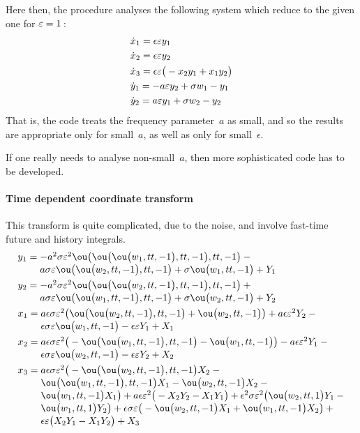 Here then, the procedure analyses the following system which reduce to the given one for \(\varepsilon=1\)\,:
\begin{align*}&
\dot x_{1}=\epsilon  \varepsilon y_{1}
\\&
\dot x_{2}=\epsilon  \varepsilon y_{2}
\\&
\dot x_{3}=\epsilon  \varepsilon \big(-x_{2} y_{1}+x_{1} y_{2}\big)
\\&
\dot y_{1}=-a \varepsilon y_{2}+\sigma  w_{1}-y_{1}
\\&
\dot y_{2}=a \varepsilon y_{1}+\sigma  w_{2}-y_{2}
\end{align*}
That is, the code treats the frequency parameter~\(a\) as small, and so the results are appropriate only for small~\(a\), as well as only for small~\(\epsilon\).

If one really needs to analyse non-small~\(a\), then more sophisticated code has to be developed.



\paragraph{Time dependent coordinate transform}
This transform is quite complicated, due to the noise, and involve fast-time future and history integrals. 
\begin{align*}&
y_{1}=\ParMath{-a^{2} \sigma  \eps^{2} \ou\big(\ou\big(\ou\big(w_{1},tt,-1\big),
tt,-1\big),tt,-1\big)-a \sigma  \eps \ou\big(\ou\big(w_{2},tt,-1\big),tt
,-1\big)+\sigma  \ou\big(w_{1},tt,-1\big)+Y_{1}
}\\&
y_{2}=\ParMath{-a^{2} \sigma  \eps^{2} \ou\big(\ou\big(\ou\big(w_{2},tt,-1\big),
tt,-1\big),tt,-1\big)+a \sigma  \eps \ou\big(\ou\big(w_{1},tt,-1\big),tt
,-1\big)+\sigma  \ou\big(w_{2},tt,-1\big)+Y_{2}
}\\&
x_{1}=\ParMath{a \epsilon  \sigma  \eps^{2} \big(\ou\big(\ou\big(w_{2},tt,-1\big)
,tt,-1\big)+\ou\big(w_{2},tt,-1\big)\big)+a \epsilon  \eps^{2} Y_{2}-
\epsilon  \sigma  \eps \ou\big(w_{1},tt,-1\big)-\epsilon  \eps Y_{1}+X_{
1}
}\\&
x_{2}=\ParMath{a \epsilon  \sigma  \eps^{2} \big(-\ou\big(\ou\big(w_{1},tt,-1
\big),tt,-1\big)-\ou\big(w_{1},tt,-1\big)\big)-a \epsilon  \eps^{2} Y_{1
}-\epsilon  \sigma  \eps \ou\big(w_{2},tt,-1\big)-\epsilon  \eps Y_{2}+X
_{2}
}\\&
x_{3}=\ParMath{a \epsilon  \sigma  \eps^{2} \big(-\ou\big(\ou\big(w_{2},tt,-1
\big),tt,-1\big) X_{2}-\ou\big(\ou\big(w_{1},tt,-1\big),tt,-1\big) X_{1}
-\ou\big(w_{2},tt,-1\big) X_{2}-\ou\big(w_{1},tt,-1\big) X_{1}\big)+a 
\epsilon  \eps^{2} \big(-X_{2} Y_{2}-X_{1} Y_{1}\big)+\epsilon ^{2} 
\sigma  \eps^{2} \big(\ou\big(w_{2},tt,1\big) Y_{1}-\ou\big(w_{1},tt,1
\big) Y_{2}\big)+\epsilon  \sigma  \eps \big(-\ou\big(w_{2},tt,-1\big) X
_{1}+\ou\big(w_{1},tt,-1\big) X_{2}\big)+\epsilon  \eps \big(X_{2} Y_{1}
-X_{1} Y_{2}\big)+X_{3}
}
\end{align*}

